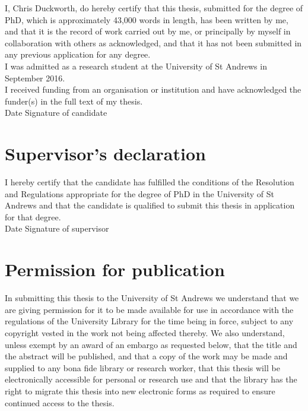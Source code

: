 \documentclass[11pt]{book}
\begin{document}
I, Chris Duckworth, do hereby certify that this thesis, submitted for the degree of PhD, which is approximately 43,000 words in length, has been written by me, and that it is the record of work carried out by me, or principally by myself in collaboration with others as acknowledged, and that it has not been submitted in any previous application for any degree.\\

\noindent I was admitted as a research student at the University of St Andrews in September 2016.\\

\noindent I received funding from an organisation or institution and have acknowledged the funder(s) in the full text of my thesis.\\

\noindent Date  \hspace{1.8in} Signature of candidate \\

\chapter{Supervisor's declaration}

I hereby certify that the candidate has fulfilled the conditions of the Resolution and Regulations appropriate for the degree of PhD in the University of St Andrews and that the candidate is qualified to submit this thesis in application for that degree.\\

\noindent Date  \hspace{1.8in} Signature of supervisor \\

\chapter{Permission for publication}
\vspace{-1em}
In submitting this thesis to the University of St Andrews we understand that we are giving permission for it to be made available for use in accordance with the regulations of the University Library for the time being in force, subject to any copyright vested in the work not being affected thereby. We also understand, unless exempt by an award of an embargo as requested below, that the title and the abstract will be published, and that a copy of the work may be made and supplied to any bona fide library or research worker, that this thesis will be electronically accessible for personal or research use and that the library has the right to migrate this thesis into new electronic forms as required to ensure continued access to the thesis.\\
\end{document}
